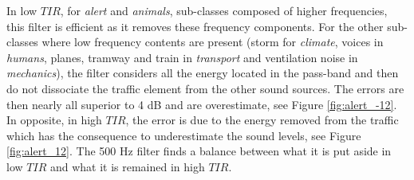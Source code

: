 \documentclass[twocolumn,a4paper,10pt]{article}
\begin{document}
In low $TIR$, for \textit{alert} and \textit{animals}, sub-classes composed of higher frequencies, this filter is efficient as it removes these frequency components. For the other sub-classes where low frequency contents are present (storm for \textit{climate}, voices in \textit{humans}, planes, tramway and train in \textit{transport} and ventilation noise in \textit{mechanics}), the filter considers all the energy located in the pass-band and then do not dissociate the traffic element from the other sound sources. The errors are then nearly all superior to 4 dB and are overestimate, see Figure \ref{fig:alert_-12}. In opposite, in high $TIR$, the error is due to the energy removed from the traffic which has the consequence to underestimate the sound levels, see Figure \ref{fig:alert_12}. The 500 Hz filter finds a balance between what it is put aside in low $TIR$ and what it is remained in high $TIR$. \\
\end{document}
